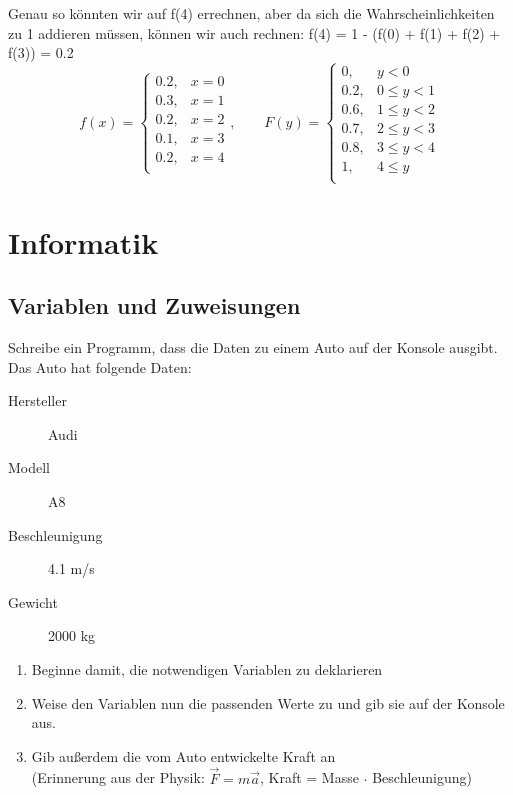 \documentclass[11pt, a4paper]{article}
\begin{document}
Genau so könnten wir auf f(4) errechnen, aber da sich die Wahrscheinlichkeiten zu 1 addieren müssen, können wir auch rechnen: f(4) = 1 - (f(0) + f(1) + f(2) + f(3)) = 0.2
\[
f(x) = 
\begin{cases}
	0.2, & x = 0 \\
	0.3, & x = 1 \\
	0.2, & x = 2 \\
	0.1, & x = 3 \\
	0.2, & x = 4 \\
\end{cases}, \qquad
F(y) =
\begin{cases}
	0, & y < 0 \\
	0.2, & 0 \leq y < 1 \\
	0.6, & 1 \leq y < 2 \\
	0.7, & 2 \leq y < 3 \\
	0.8, & 3 \leq y < 4 \\
	1, & 4 \leq y \\
\end{cases}
\]

\newpage
\section{Informatik}
\subsection{Variablen und Zuweisungen}
Schreibe ein Programm, dass die Daten zu einem Auto auf der Konsole ausgibt. Das Auto hat folgende Daten:
\begin{description}
	\item[Hersteller] Audi
	\item[Modell] A8
	\item[Beschleunigung] 4.1 m/s
	\item[Gewicht] 2000 kg
\end{description}
\begin{enumerate}
	\item Beginne damit, die notwendigen Variablen zu deklarieren
	\item Weise den Variablen nun die passenden Werte zu und gib sie auf der Konsole aus.
	\item Gib außerdem die vom Auto entwickelte Kraft an \\
	(Erinnerung aus der Physik: $\vec{F}=m\vec{a}$, Kraft = Masse $\cdot$ Beschleunigung)
\end{enumerate}


\end{document}
